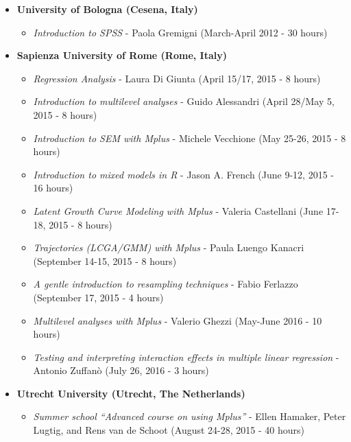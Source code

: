 \documentclass[hidelinks, letterpaper,10pt]{article} %
\begin{document}
\begin{itemize}

\item \textbf{University of Bologna (Cesena, Italy)} \\
    \begin{itemize}
    \item \textit{Introduction to SPSS} - Paola Gremigni (March-April 2012 - 30 hours)
    \end{itemize}
    
\item \textbf{Sapienza University of Rome (Rome, Italy)} \\
   \begin{itemize}
   \item \textit{Regression Analysis} - Laura Di Giunta (April 15/17, 2015 - 8 hours) \\
   \item \textit{Introduction to multilevel analyses} - Guido Alessandri (April 28/May 5, 2015 - 8 hours) \\
   \item \textit{Introduction to SEM with Mplus} - Michele Vecchione (May 25-26, 2015 - 8 hours) \\
   \item \textit{Introduction to mixed models in R} - Jason A. French (June 9-12, 2015 - 16 hours) \\
   \item \textit{Latent Growth Curve Modeling with Mplus} - Valeria Castellani (June 17-18, 2015 - 8 hours) \\
   \item \textit{Trajectories (LCGA/GMM) with Mplus} - Paula Luengo Kanacri (September 14-15, 2015 - 8 hours) \\
   \item \textit{A gentle introduction to resampling techniques} - Fabio Ferlazzo (September 17, 2015 - 4 hours) \\
   \item \textit{Multilevel analyses with Mplus} - Valerio Ghezzi (May-June 2016 - 10 hours) \\
   \item \textit{Testing and interpreting interaction effects in multiple linear regression} - Antonio Zuffanò (July 26, 2016 - 3 hours)
   \end{itemize}

\item \textbf{Utrecht University (Utrecht, The Netherlands)} \\
    \begin{itemize}
    \item \textit{Summer school “Advanced course on using Mplus”} - Ellen Hamaker, Peter Lugtig, and Rens van de Schoot (August 24-28, 2015 - 40 hours) \\
    \end{itemize}


\end{itemize}
\end{document}
